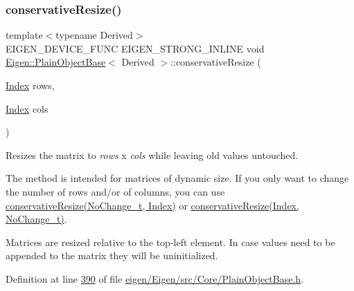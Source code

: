 \subsubsection{\texorpdfstring{conservative\+Resize()}{conservativeResize()}\hspace{0.1cm}{\footnotesize\ttfamily [1/8]}}
{\footnotesize\ttfamily template$<$typename Derived$>$ \\
E\+I\+G\+E\+N\+\_\+\+D\+E\+V\+I\+C\+E\+\_\+\+F\+U\+NC E\+I\+G\+E\+N\+\_\+\+S\+T\+R\+O\+N\+G\+\_\+\+I\+N\+L\+I\+NE void \hyperlink{class_eigen_1_1_plain_object_base}{Eigen\+::\+Plain\+Object\+Base}$<$ Derived $>$\+::conservative\+Resize (\begin{DoxyParamCaption}\item[{\hyperlink{namespace_eigen_a62e77e0933482dafde8fe197d9a2cfde}{Index}}]{rows,  }\item[{\hyperlink{namespace_eigen_a62e77e0933482dafde8fe197d9a2cfde}{Index}}]{cols }\end{DoxyParamCaption})\hspace{0.3cm}{\ttfamily [inline]}}

Resizes the matrix to {\itshape rows} x {\itshape cols} while leaving old values untouched.

The method is intended for matrices of dynamic size. If you only want to change the number of rows and/or of columns, you can use \hyperlink{class_eigen_1_1_plain_object_base_a46afa73816539b0fe36c6e9abd7978a6}{conservative\+Resize(\+No\+Change\+\_\+t, Index)} or \hyperlink{class_eigen_1_1_plain_object_base_a528879aef40f9cbc4ab4925e4a6bceb9}{conservative\+Resize(\+Index, No\+Change\+\_\+t)}.

Matrices are resized relative to the top-\/left element. In case values need to be appended to the matrix they will be uninitialized. 

Definition at line \hyperlink{eigen_2_eigen_2src_2_core_2_plain_object_base_8h_source_l00390}{390} of file \hyperlink{eigen_2_eigen_2src_2_core_2_plain_object_base_8h_source}{eigen/\+Eigen/src/\+Core/\+Plain\+Object\+Base.\+h}.

\mbox{\label{class_eigen_1_1_plain_object_base_a5e06c62950ba98fe8ba9c7d4be9c19e4}} 
